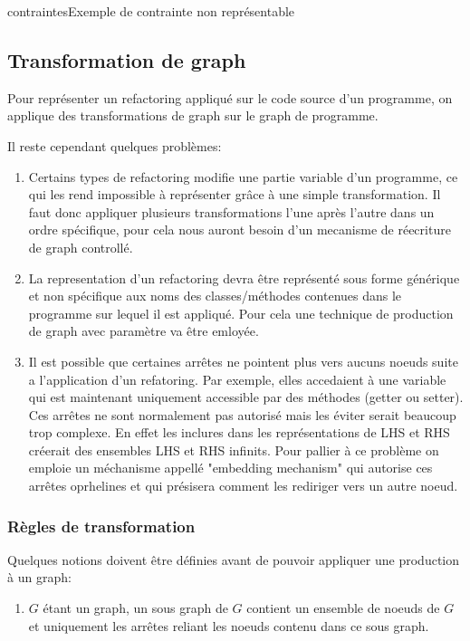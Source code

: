 \documentclass[a4paper, 12pt]{article}
\begin{document}
\begin{figu}{contraintes}{Exemple de contrainte non représentable}
  \subsection{Transformation de graph}

  Pour représenter un refactoring appliqué sur le code source d'un programme, on applique des transformations de graph sur le graph de programme.

  Il reste cependant quelques problèmes:

  \begin{enumerate}
    \item Certains types de refactoring modifie une partie variable d'un programme, ce qui les rend impossible à représenter grâce à une simple transformation.
    Il faut donc appliquer plusieurs transformations l'une après l'autre dans un ordre spécifique, pour cela nous auront besoin d'un mecanisme de réecriture de graph controllé.

    \item La representation d'un refactoring devra être représenté sous forme générique et non spécifique aux noms des classes/méthodes contenues dans le programme sur lequel il est appliqué.
    Pour cela une technique de production de graph avec paramètre va être emloyée.

    \item Il est possible que certaines arrêtes ne pointent plus vers aucuns noeuds suite a l'application d'un refatoring.
    Par exemple, elles accedaient à une variable qui est maintenant uniquement accessible par des méthodes (getter ou setter).
    Ces arrêtes ne sont normalement pas autorisé mais les éviter serait beaucoup trop complexe.
    En effet les inclures dans les représentations de LHS et RHS créerait des ensembles LHS et RHS infinits.
    Pour pallier à ce problème on emploie un méchanisme appellé "embedding mechanism" qui autorise ces arrêtes oprhelines et qui présisera comment les rediriger vers un autre noeud.

  \end{enumerate}

  \subsubsection{Règles de transformation}

  Quelques notions doivent être définies avant de pouvoir appliquer une production à un graph:

  \begin{enumerate}
    \item \(G\) étant un graph, un sous graph de \(G\) contient un ensemble de noeuds de \(G\) et uniquement les arrêtes reliant les noeuds contenu dans ce sous graph.


\end{enumerate}
\end{figu}
\end{document}
